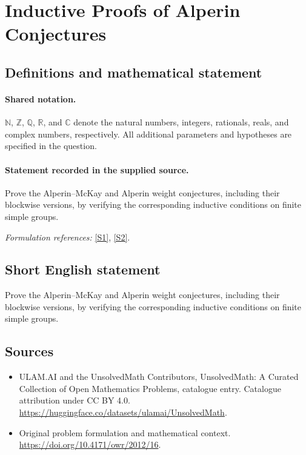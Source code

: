 \documentclass[11pt]{article}
\newcommand{\sref}[2]{\hyperlink{source:#1:#2}{[S#2]}}
\begin{document}
\section{Inductive Proofs of Alperin Conjectures}\label{statement}

\subsection{Definitions and mathematical statement}

\paragraph{Shared notation.}$\mathbb N$, $\mathbb Z$, $\mathbb Q$, $\mathbb R$, and $\mathbb C$ denote the natural numbers, integers, rationals, reals, and complex numbers, respectively. All additional parameters and hypotheses are specified in the question.


\paragraph{Statement recorded in the supplied source.}
Prove the Alperin–McKay and Alperin weight conjectures, including their blockwise versions, by verifying the corresponding inductive conditions on finite simple groups.
\par\smallskip\textit{Formulation references:} \sref{statement}{1}, \sref{statement}{2}.
\subsection{Short English statement}
Prove the Alperin–McKay and Alperin weight conjectures, including their blockwise versions, by verifying the corresponding inductive conditions on finite simple groups.
\subsection{Sources}
\begin{itemize}
\item[\hypertarget{source:statement:1}{S1}] ULAM.AI and the UnsolvedMath Contributors, UnsolvedMath: A Curated Collection of Open Mathematics Problems, catalogue entry. Catalogue attribution under CC BY 4.0.
\url{https://huggingface.co/datasets/ulamai/UnsolvedMath}.
\item[\hypertarget{source:statement:2}{S2}] Original problem formulation and mathematical context.
\url{https://doi.org/10.4171/owr/2012/16}.
\end{itemize}
\label{end:statement}
\end{document}
